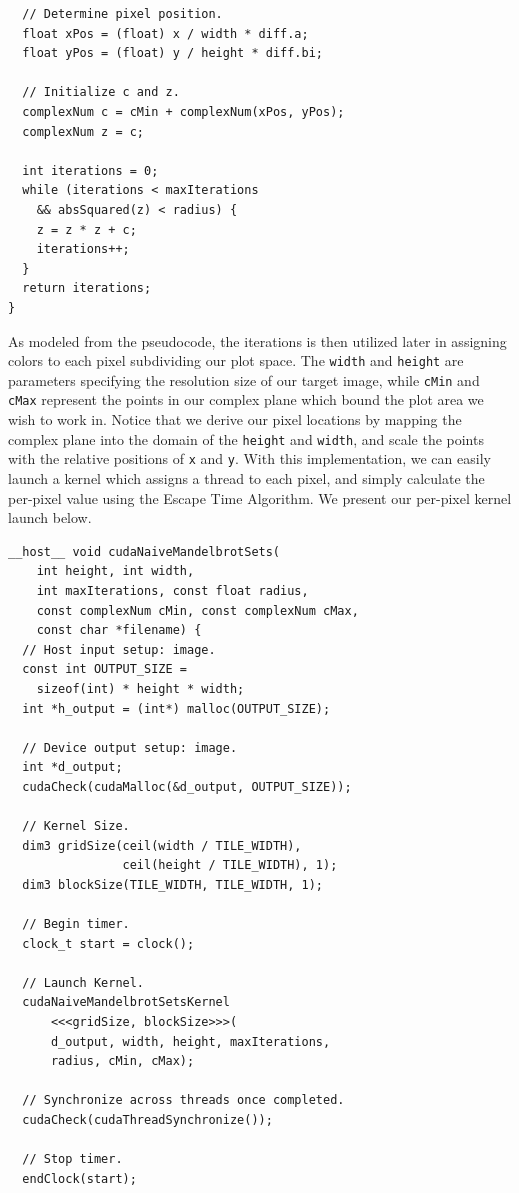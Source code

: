 \documentclass[letterpaper]{article}
\begin{document}
\begin{multicols}{2}
\begin{lstlisting}
  // Determine pixel position.
  float xPos = (float) x / width * diff.a;
  float yPos = (float) y / height * diff.bi;

  // Initialize c and z.
  complexNum c = cMin + complexNum(xPos, yPos);
  complexNum z = c;

  int iterations = 0;
  while (iterations < maxIterations 
    && absSquared(z) < radius) {
    z = z * z + c;
    iterations++;
  }
  return iterations;
}
\end{lstlisting}

As modeled from the pseudocode, the iterations is then utilized later in
  assigning colors to each pixel subdividing our plot space. The \texttt{width}
  and \texttt{height} are parameters specifying the resolution size of our
  target image, while \texttt{cMin} and \texttt{cMax} represent the points in
  our complex plane which bound the plot area we wish to work in. Notice that we
  derive our pixel locations by mapping the complex plane into the domain of the
  \texttt{height} and \texttt{width}, and scale the points with the relative
  positions of \texttt{x} and \texttt{y}.
With this implementation, we can easily launch a kernel which assigns a thread
  to each pixel, and simply calculate the per-pixel value using the Escape Time
  Algorithm.
We present our per-pixel kernel launch below.

\begin{lstlisting}
__host__ void cudaNaiveMandelbrotSets(
    int height, int width, 
    int maxIterations, const float radius, 
    const complexNum cMin, const complexNum cMax, 
    const char *filename) {
  // Host input setup: image.
  const int OUTPUT_SIZE = 
    sizeof(int) * height * width;
  int *h_output = (int*) malloc(OUTPUT_SIZE);

  // Device output setup: image.
  int *d_output;
  cudaCheck(cudaMalloc(&d_output, OUTPUT_SIZE));

  // Kernel Size.
  dim3 gridSize(ceil(width / TILE_WIDTH), 
                ceil(height / TILE_WIDTH), 1); 
  dim3 blockSize(TILE_WIDTH, TILE_WIDTH, 1); 

  // Begin timer.
  clock_t start = clock();

  // Launch Kernel.
  cudaNaiveMandelbrotSetsKernel
      <<<gridSize, blockSize>>>(
      d_output, width, height, maxIterations, 
      radius, cMin, cMax);

  // Synchronize across threads once completed.
  cudaCheck(cudaThreadSynchronize());

  // Stop timer.
  endClock(start);


\end{lstlisting}
\end{multicols}
\end{document}
